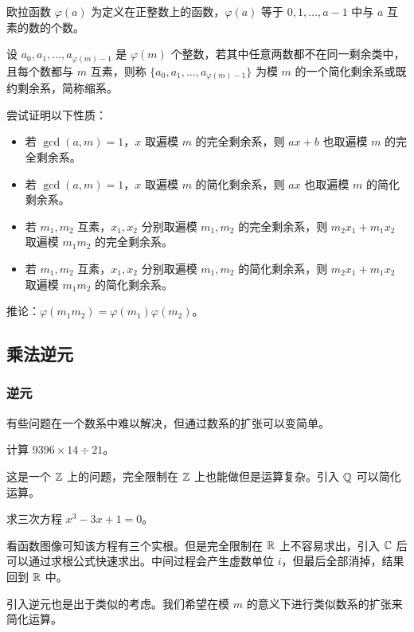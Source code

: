 \documentclass[../main.tex]{subfiles}
\begin{document}
\begin{frame}
\begin{defi}[欧拉函数]
欧拉函数 $\varphi(a)$ 为定义在正整数上的函数，$\varphi(a)$ 等于 $0,1,\dots,a-1$ 中与 $a$ 互素的数的个数。
\end{defi} \pause

\begin{defi}[简化剩余系]
设 $a_0,a_1,\dots,a_{\varphi(m)-1}$ 是 $\varphi(m)$ 个整数，若其中任意两数都不在同一剩余类中，且每个数都与 $m$ 互素，则称 $\{a_0,a_1,\dots,a_{\varphi(m)-1}\}$ 为模 $m$ 的一个简化剩余系或既约剩余系，简称缩系。
\end{defi}
\end{frame}

\begin{frame}
尝试证明以下性质： \pause

\begin{theo}
\begin{itemize}
\item 若 $\gcd(a,m)=1$，$x$ 取遍模 $m$ 的完全剩余系，则 $ax+b$ 也取遍模 $m$ 的完全剩余系。 \pause
\item 若 $\gcd(a,m)=1$，$x$ 取遍模 $m$ 的简化剩余系，则 $ax$ 也取遍模 $m$ 的简化剩余系。 \pause
\item 若 $m_1,m_2$ 互素，$x_1,x_2$ 分别取遍模 $m_1,m_2$ 的完全剩余系，则 $m_2x_1+m_1x_2$ 取遍模 $m_1m_2$ 的完全剩余系。 \pause
\item 若 $m_1,m_2$ 互素，$x_1,x_2$ 分别取遍模 $m_1,m_2$ 的简化剩余系，则 $m_2x_1+m_1x_2$ 取遍模 $m_1m_2$ 的简化剩余系。
\end{itemize}
\end{theo} \pause

推论：$\varphi(m_1m_2)=\varphi(m_1)\varphi(m_2)$。
\end{frame}

\subsection{乘法逆元}

\subsubsection{逆元}

\begin{frame}
有些问题在一个数系中难以解决，但通过数系的扩张可以变简单。 \pause

\begin{eg}[从 $\Z$ 到 $\Q$]
计算 $9396\times 14\div 21$。 \pause

这是一个 $\Z$ 上的问题，完全限制在 $\Z$ 上也能做但是运算复杂。引入 $\Q$ 可以简化运算。 \pause
\end{eg}

\begin{eg}[从 $\R$ 到 $\C$]
求三次方程 $x^3-3x+1=0$。 \pause

看函数图像可知该方程有三个实根。但是完全限制在 $\R$ 上不容易求出，引入 $\C$ 后可以通过求根公式快速求出。中间过程会产生虚数单位 $i$，但最后全部消掉，结果回到 $\R$ 中。
\end{eg} \pause

引入逆元也是出于类似的考虑。我们希望在模 $m$ 的意义下进行类似数系的扩张来简化运算。
\end{frame}
\end{document}
